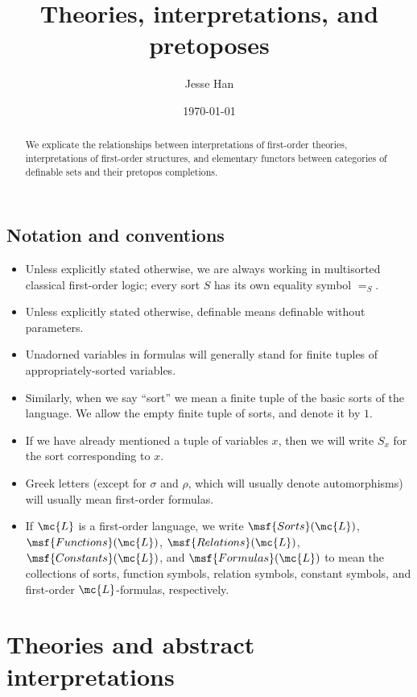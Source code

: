 \documentclass[11pt]{article}
\begin{document}
\title{Theories, interpretations, and pretoposes}
\author{Jesse Han}
\date{\today}

\maketitle

\begin{abstract}
  We explicate the relationships between interpretations of first-order theories, interpretations of first-order structures, and elementary functors between categories of definable sets and their pretopos completions.
\end{abstract}

\tableofcontents

\subsection*{Notation and conventions}
\begin{itemize}
\item Unless explicitly stated otherwise, we are always working in multisorted classical first-order logic; every sort $S$ has its own equality symbol $=_S$.
\item Unless explicitly stated otherwise, definable means definable without parameters.
\item Unadorned variables in formulas will generally stand for finite tuples of appropriately-sorted variables.
\item Similarly, when we say ``sort'' we mean a finite tuple of the basic sorts of the language. We allow the empty finite tuple of sorts, and denote it by $1$.
\item If we have already mentioned a tuple of variables $x$, then we will write $S_x$ for the sort corresponding to $x$.
\item Greek letters (except for $\sigma$ and $\rho$, which will usually denote automorphisms) will usually mean first-order formulas.
\item If $\mc{L}$ is a first-order language, we write $\msf{Sorts}(\mc{L})$, $\msf{Functions}(\mc{L})$, $\msf{Relations}(\mc{L})$, $\msf{Constants}(\mc{L})$, and $\msf{Formulas}(\mc{L})$ to mean the collections of sorts, function symbols, relation symbols, constant symbols, and first-order $\mc{L}$-formulas, respectively.
\end{itemize}

\section{Theories and abstract interpretations}
\end{document}
